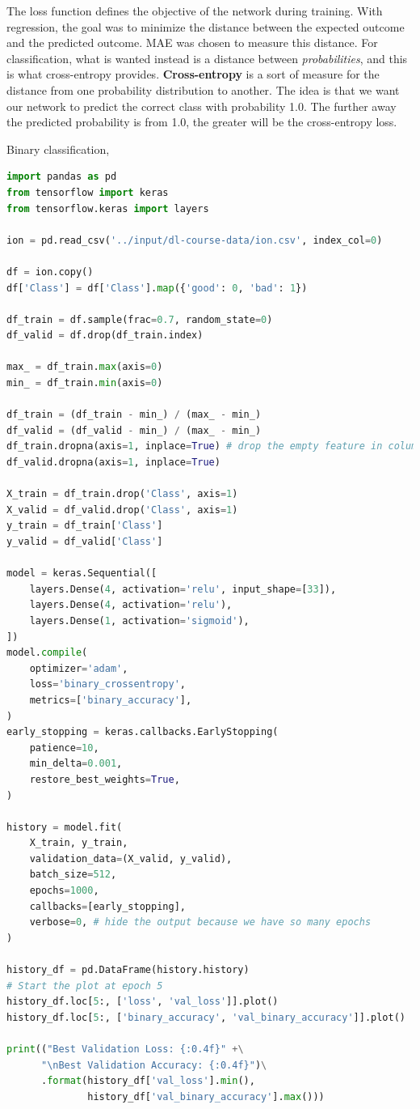 \noindent The loss function defines the objective of the network during training. With
regression, the goal was to minimize the distance between the expected outcome and the 
predicted outcome. MAE was chosen to measure this distance. For classification, what is
wanted instead is a distance between \emph{probabilities}, and this is what cross-entropy
provides. \textbf{Cross-entropy} is a sort of measure for the distance from one probability
distribution to another. The idea is that we want our network to predict the correct class
with probability 1.0. The further away the predicted probability is from 1.0, the greater
will be the cross-entropy loss.

\vspace{0.5cm}

\noindent Binary classification,

\begin{lstlisting}[language=Python]
import pandas as pd
from tensorflow import keras
from tensorflow.keras import layers

ion = pd.read_csv('../input/dl-course-data/ion.csv', index_col=0)

df = ion.copy()
df['Class'] = df['Class'].map({'good': 0, 'bad': 1})

df_train = df.sample(frac=0.7, random_state=0)
df_valid = df.drop(df_train.index)

max_ = df_train.max(axis=0)
min_ = df_train.min(axis=0)

df_train = (df_train - min_) / (max_ - min_)
df_valid = (df_valid - min_) / (max_ - min_)
df_train.dropna(axis=1, inplace=True) # drop the empty feature in column 2
df_valid.dropna(axis=1, inplace=True)

X_train = df_train.drop('Class', axis=1)
X_valid = df_valid.drop('Class', axis=1)
y_train = df_train['Class']
y_valid = df_valid['Class']

model = keras.Sequential([
    layers.Dense(4, activation='relu', input_shape=[33]),
    layers.Dense(4, activation='relu'),    
    layers.Dense(1, activation='sigmoid'),
])
model.compile(
    optimizer='adam',
    loss='binary_crossentropy',
    metrics=['binary_accuracy'],
)
early_stopping = keras.callbacks.EarlyStopping(
    patience=10,
    min_delta=0.001,
    restore_best_weights=True,
)

history = model.fit(
    X_train, y_train,
    validation_data=(X_valid, y_valid),
    batch_size=512,
    epochs=1000,
    callbacks=[early_stopping],
    verbose=0, # hide the output because we have so many epochs
)

history_df = pd.DataFrame(history.history)
# Start the plot at epoch 5
history_df.loc[5:, ['loss', 'val_loss']].plot()
history_df.loc[5:, ['binary_accuracy', 'val_binary_accuracy']].plot()

print(("Best Validation Loss: {:0.4f}" +\
      "\nBest Validation Accuracy: {:0.4f}")\
      .format(history_df['val_loss'].min(), 
              history_df['val_binary_accuracy'].max()))
\end{lstlisting}


